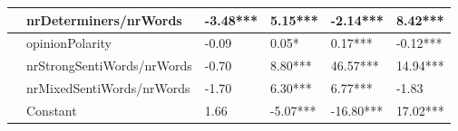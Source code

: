 \begin{tabular}{|l|l|l|l|l|l|}
 & nrDeterminers/nrWords & -3.48*** & \phantom{-}5.15*** & -2.14*** & \phantom{-}8.42*** \\ \hline
\parbox[t]{2mm}{} & opinionPolarity & -0.09 & \phantom{-}0.05* & \phantom{-}0.17*** & -0.12*** \\ 
 & nrStrongSentiWords/nrWords & -0.70 & \phantom{-}8.80*** & \phantom{-}46.57*** & \phantom{-}14.94*** \\ 
 & nrMixedSentiWords/nrWords & -1.70 & \phantom{-}6.30*** & \phantom{-}6.77*** & -1.83 \\ \hline
{} & Constant & \phantom{-}1.66 & -5.07*** & -16.80*** & \phantom{-}17.02*** \\ 
\end{tabular}
